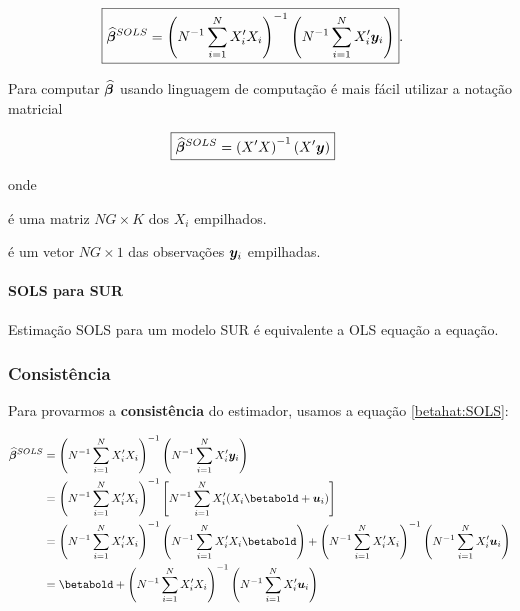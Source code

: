 \documentclass[11pt, oneside, a4paper, article]{article}
\numberwithin{equation}{section}
\begin{document}
\vspace{-1 em}
\begin{align} \label{betahat:SOLS}
\Aboxed{
\betahatbold^{SOLS} &=
\left( N^{-1} \sum_{i=1}^{N} X_{i}' X_{i}   \right)^{-1}
\left( N^{-1} \sum_{i=1}^{N} X_{i}' \mbs{y}_{i}   \right)
}.
\end{align}

Para computar $\widehat{\boldsymbol{\beta}}$ usando linguagem de computação é mais fácil utilizar a notação matricial

\vspace{-1 em}
\begin{align} \label{betahat:SOLS:mat}
\Aboxed{
\betahatbold^{SOLS} &=
\left(  X' X   \right)^{-1} \left(  X' \mbs{y}   \right)
}
\end{align}

\noindent
onde

\vspace{-1 em}
\begin{description}[itemsep = -1ex]
\item [$X \equiv (X_{1}', \dots, X_{N}')$]  é uma matriz $NG \times K$ dos $X_{i}$ empilhados.

\item [$\mbs{y} \equiv (\mbs{y}_{1}', \dots, \mbs{y}_{N}')$] é um vetor $NG \times 1$ das observações $\boldsymbol{y}_{i}$ empilhadas.
\end{description}

\paragraph{SOLS para SUR} Estimação SOLS para um modelo SUR é equivalente a OLS equação a equação.

\subsubsection{Consistência}

Para provarmos a \textbf{consistência} do estimador, usamos a equação \eqref{betahat:SOLS}:

\vspace{-1 em}
\begin{align*}
\betahatbold^{SOLS} &=
\left( N^{-1}\sum_{i=1}^{N} X_{i}' X_{i}   \right)^{-1}
\left( N^{-1}\sum_{i=1}^{N} X_{i}' \mbs{y}_{i}   \right)
\\ &=
\left( N^{-1}\sum_{i=1}^{N} X_{i}' X_{i}   \right)^{-1}
\left[ N^{-1}\sum_{i=1}^{N} X_{i}' (X_{i} \betabold + \mbs{u}_{i})   \right]
\\ &=
\left( N^{-1}\sum_{i=1}^{N} X_{i}' X_{i}   \right)^{-1}
\left( N^{-1}\sum_{i=1}^{N} X_{i}' X_{i} \betabold    \right)
+
\left( N^{-1}\sum_{i=1}^{N} X_{i}' X_{i}   \right)^{-1}
\left( N^{-1}\sum_{i=1}^{N} X_{i}' \mbs{u}_{i}   \right)
\\ &=
\betabold
+
\left( N^{-1}\sum_{i=1}^{N} X_{i}' X_{i}   \right)^{-1}
\left( N^{-1}\sum_{i=1}^{N} X_{i}' \mbs{u}_{i}   \right)
\end{align*}
\end{document}
